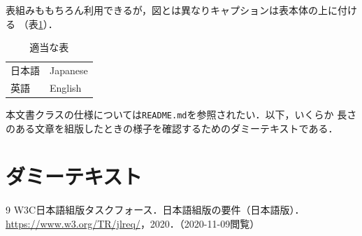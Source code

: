 \documentclass[
  platex, dvipdfmx,  %
]{nlproceedings}
\newcommand{\code}[1]{\texttt{#1}}
\begin{document}
表組みももちろん利用できるが，図とは異なりキャプションは表本体の上に付ける
（表\ref{tab:sample}）．
%
\begin{table}[h]
\centering
\caption{適当な表}
\label{tab:sample}
\begin{tabular}{ll}
\hline
日本語 & Japanese \\
英語 & English \\
\hline
\end{tabular}
\end{table}

本文書クラスの仕様については\code{README.md}を参照されたい．以下，いくらか
長さのある文章を組版したときの様子を確認するためのダミーテキストである．

\section{ダミーテキスト}



\begin{thebibliography}{9}
  W3C日本語組版タスクフォース．日本語組版の要件（日本語版）．
  \url{https://www.w3.org/TR/jlreq/}，2020．（2020-11-09閲覧）
\end{thebibliography}
\end{document}
